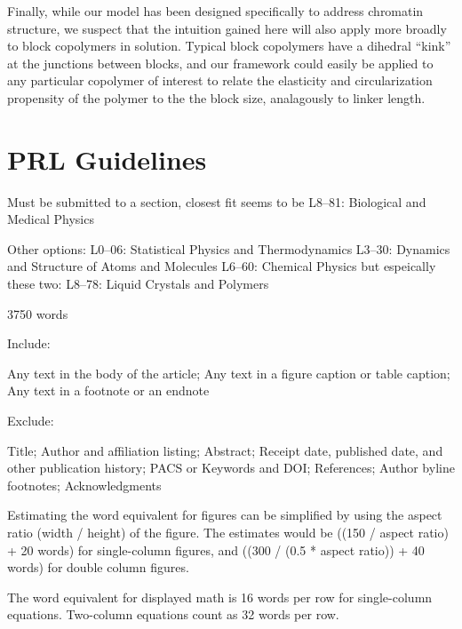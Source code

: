 \documentclass[%
 reprint,
superscriptaddress,
showpacs,preprintnumbers,
 amsmath,amssymb,
 aps,
 prl,
]{revtex4-1}
\begin{document}
Finally, while our model has been designed specifically to address chromatin
    structure, we suspect that the intuition gained here will also apply more
    broadly to block copolymers in solution.
Typical block copolymers have a dihedral ``kink'' at the junctions between
    blocks, and our framework could easily be applied to any particular
    copolymer of interest to relate the elasticity and circularization
    propensity of the polymer to the the block size, analagously to linker
    length.


\section{PRL Guidelines}

Must be submitted to a section, closest fit seems to be
L8--81: Biological and Medical Physics

Other options:
L0--06: Statistical Physics and Thermodynamics
L3--30: Dynamics and Structure of Atoms and Molecules
L6--60: Chemical Physics
but espeically these two:
L8--78: Liquid Crystals and Polymers


3750 words

Include:

Any text in the body of the article;
Any text in a figure caption or table caption;
Any text in a footnote or an endnote

Exclude:

Title;
Author and affiliation listing;
Abstract;
Receipt date, published date, and other publication history;
PACS or Keywords and DOI;\@
References;
Author byline footnotes;
Acknowledgments

Estimating the word equivalent for figures can be simplified by using the aspect
ratio (width / height) of the figure. The estimates would be ((150 / aspect
ratio) + 20 words) for single-column figures, and ((300 / (0.5 * aspect ratio))
+ 40 words) for double column figures.

The word equivalent for displayed math is 16 words per row for single-column
equations. Two-column equations count as 32 words per row.


\end{document}
